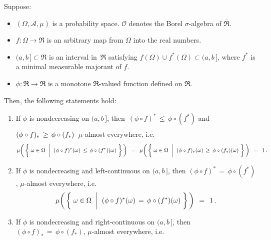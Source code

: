 
\begin{lemma}
\label{longLemma}
\mbox{}\vskip 0.1cm
\noindent
Suppose:
\begin{itemize}
\item
	$(\Omega,\mathcal{A},\mu)$ is a probability space.
	$\mathcal{O}$ denotes the Borel $\sigma$-algebra of $\overline{\Re}$.
\item
	$f : \Omega \longrightarrow \Re$ is an arbitrary map from $\Omega$ into the real numbers.
\item
	$(a,b\,] \subset \Re$ is an interval in \,$\Re$ satisfying $f(\Omega) \cup f^{*}(\Omega) \subset (a,b\,]$,
	where $f^{*}$ is a minimal measurable majorant of $f$.
\item
	$\phi : \Re \longrightarrow \Re$ is a monotone $\Re$-valued function defined on $\Re$.
\end{itemize}
Then, the following statements hold:
\begin{enumerate}
\item
	If $\phi$ is nondecreasing on $(a,b\,]$, then
	\,$(\phi \circ f)^{*} \,\leq\, \phi \circ (f^{*})$
	\;and\;
	$(\phi \circ f)_{*} \,\overset{{\color{white}\vert}}{\geq}\, \phi \circ (f_{*})$
	\,$\mu$-almost everywhere, i.e.
	\begin{equation*}
	\mu\!\left(\,\left\{\;
		\omega \in \Omega
		\,\;\left\vert\;\;
		(\phi \circ f)^{*}(\omega) \,\overset{{\color{white}\vert}}{\leq}\, \phi \circ (f^{*})(\omega)
		\right.
	\,\right\}\,\right)
	\,\;=\;\,
	\mu\!\left(\,\left\{\;
		\omega \in \Omega
		\,\;\left\vert\;\;
		(\phi \circ f)_{*}(\omega) \,\overset{{\color{white}\vert}}{\geq}\, \phi \circ (f_{*})(\omega)
		\right.
	\,\right\}\,\right)
	\,\;=\;\, 1\,.
	\end{equation*}
\item
	If $\phi$ is nondecreasing and left-continuous on $(a,b\,]$, then
	$(\phi \circ f)^{*} \,=\, \phi \circ (f^{*})$, $\mu$-almost everywhere, i.e.
	\begin{equation*}
	\mu\!\left(\,\left\{\;
		\omega \in \Omega
		\,\;\left\vert\;\;
		(\phi \circ f)^{*}(\omega) \,\overset{{\color{white}\vert}}{=}\, \phi \circ (f^{*})(\omega)
		\right.
	\,\right\}\,\right)
	\,\;=\;\, 1\,.
	\end{equation*}
\item
	If $\phi$ is nondecreasing and right-continuous on $(a,b\,]$, then
	$(\phi \circ f)_{*} \,=\, \phi \circ (f_{*})$, $\mu$-almost everywhere, i.e.
	\begin{equation*}

\end{equation*}
\end{enumerate}
\end{lemma}
